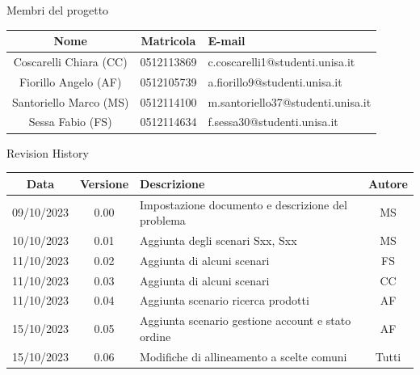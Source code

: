 \documentclass[12pt, a4paper, oneside]{book}
\begin{document}
    \newpage
    \begin{center}
    {\LARGE{Membri del progetto}}
    \end{center}
    \begin{center}
        \begin{tabular}{|c|c|m{8cm}|}
            \hline
            \cellcolor{lightgray} \textbf{Nome} & \cellcolor{lightgray} \textbf{Matricola} & \cellcolor{lightgray} \textbf{E-mail}\\ \hline
            Coscarelli Chiara (CC) & 0512113869 & c.coscarelli1@studenti.unisa.it\\ \hline
            Fiorillo Angelo (AF) & 0512105739 & a.fiorillo9@studenti.unisa.it\\ \hline
            Santoriello Marco (MS) &  0512114100 & m.santoriello37@studenti.unisa.it\\ \hline
            Sessa Fabio (FS) & 0512114634 & f.sessa30@studenti.unisa.it\\ \hline
        \end{tabular}
    \end{center}

    \begin{center}
    {\LARGE{Revision History}}
    \end{center}

    \begin{center}
        \begin{tabular}{|c|c|m{8cm}|c|}
            \hline
            \cellcolor{lightgray} \textbf{Data} & \cellcolor{lightgray} \textbf{Versione} & \cellcolor{lightgray} \textbf{Descrizione} & \cellcolor{lightgray} \textbf{Autore}\\ \hline
            09/10/2023 & 0.00 & Impostazione documento e descrizione del problema & MS\\ \hline
            10/10/2023 & 0.01 & Aggiunta degli scenari Sxx, Sxx & MS\\ \hline
            11/10/2023 & 0.02 & Aggiunta di alcuni scenari & FS\\ \hline
            11/10/2023 & 0.03 & Aggiunta di alcuni scenari & CC\\ \hline
            11/10/2023 & 0.04 & Aggiunta scenario ricerca prodotti & AF\\ \hline
            15/10/2023 & 0.05 & Aggiunta scenario gestione account e stato ordine & AF\\ \hline
            15/10/2023 & 0.06 & Modifiche di allineamento a scelte comuni & Tutti\\ \hline
        \end{tabular}
    \end{center}
\end{document}

